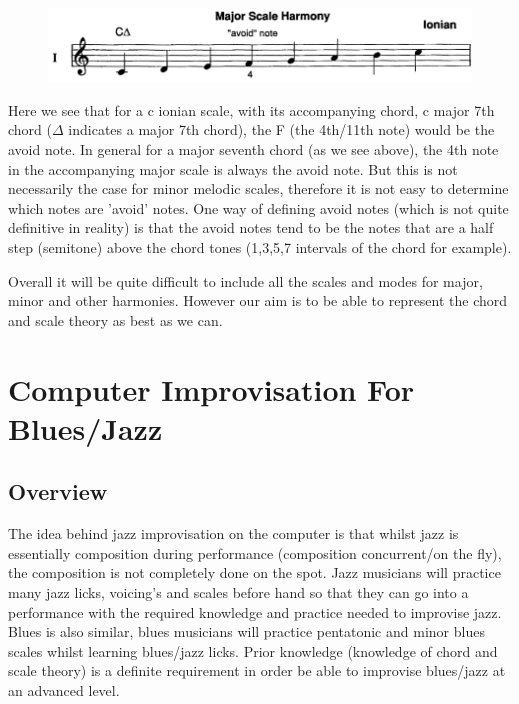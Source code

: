 \documentclass[pdftex,12pt,a4paper]{report}
\begin{document}
\begin{figure}[here]
  \centering
  \includegraphics[scale=0.4]{figure/cionian.png}
  \label{fig:cionian}
\end{figure}

Here we see that for a c ionian scale, with its accompanying chord, c major 7th chord ($\Delta$ indicates a major 7th chord), the F (the 4th/11th note) would be the avoid note.  In general for a major seventh chord (as we see above), the 4th note in the accompanying major scale is always the avoid note. But this is not necessarily the case for minor melodic scales, therefore it is not easy to determine which notes are 'avoid' notes. One way of defining avoid notes (which is not quite definitive in reality) is that the avoid notes tend to be the notes that are a half step (semitone) above the chord tones (1,3,5,7 intervals of the chord for example).

Overall it will be quite difficult to include all the scales and modes for major, minor and other harmonies. However our aim is to be able to represent the chord and scale theory as best as we can.

\section{Computer Improvisation For Blues/Jazz}

\subsection{Overview}
The idea behind jazz improvisation on the computer is that whilst jazz is essentially composition during performance (composition concurrent/on the fly), the composition is not completely done on the spot. Jazz musicians will practice many jazz licks, voicing's and scales before hand so that they can go into a performance with the required knowledge and practice needed to improvise jazz. Blues is also similar, blues musicians will practice pentatonic and minor blues scales whilst learning blues/jazz licks. Prior knowledge (knowledge of chord and scale theory) is a definite requirement in order be able to improvise blues/jazz at an advanced level.
\end{document}
